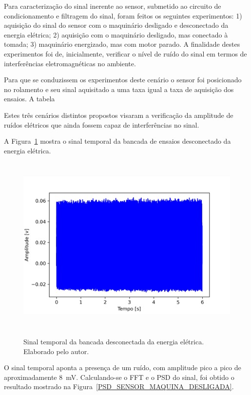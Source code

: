 \documentclass[
	12pt,				
	oneside,			
	a4paper,			
	english,			
	brazil,			
	]{abntex2ppgsi}
\begin{document}
Para caracterização do sinal inerente ao sensor, submetido ao circuito de condicionamento e filtragem do sinal, foram feitos os seguintes experimentos: 1) aquisição do sinal do sensor com o maquinário desligado e desconectado da energia elétrica; 2) aquisição com o maquinário desligado, mas conectado à tomada; 3) maquinário energizado, mas com motor parado. A finalidade destes experimentos foi de, inicialmente, verificar o nível de ruído do sinal em termos de interferências eletromagnéticas no ambiente.

Para que se conduzissem os experimentos deste cenário o sensor foi posicionado no rolamento e seu sinal aquisitado a uma taxa igual a taxa de aquisição dos ensaios. A tabela 

Estes três cenários distintos propostos visaram a verificação da amplitude de ruídos elétricos que ainda fossem capaz de interferências no sinal. 

A Figura~\ref{maquina_desligada_da_tomada} mostra o sinal temporal da bancada de ensaios desconectado da energia elétrica. 

\begin{figure}[H]
\centering
\caption {Sinal temporal da bancada desconectada da energia elétrica. Elaborado pelo autor.}
\includegraphics[width=\textwidth,height=90mm,keepaspectratio]{Caso0/maquina_desligada_da_tomada}
\label{maquina_desligada_da_tomada}
\end{figure} 

O sinal temporal aponta a presença de um ruído, com amplitude pico a pico de aproximadamente {\SI{8}{\milli\volt}}. Calculando-se o FFT e o PSD do sinal, foi obtido o resultado mostrado na Figura~\ref{PSD_SENSOR_MAQUINA_DESLIGADA}. 
\end{document}
